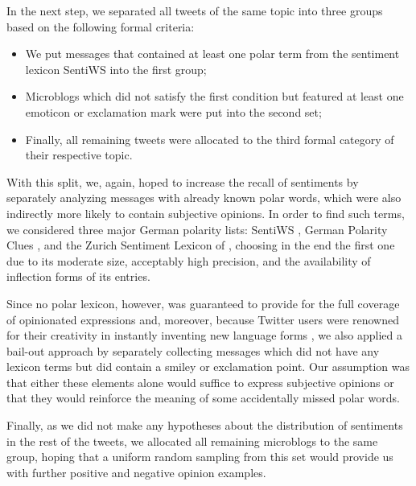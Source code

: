 In the next step, we separated all tweets of the same topic into three
groups based on the following formal criteria:
\begin{itemize}
\item We put messages that contained at least one polar term from the
  sentiment lexicon SentiWS \cite{Remus:10} into the first group;
\item Microblogs which did not satisfy the first condition but
  featured at least one emoticon or exclamation mark were put into the
  second set;
\item Finally, all remaining tweets were allocated to the third formal
  category of their respective topic.
\end{itemize}
With this split, we, again, hoped to increase the recall of sentiments
by separately analyzing messages with already known polar words, which
were also indirectly more likely to contain subjective opinions.  In
order to find such terms, we considered three major German polarity
lists: SentiWS \cite{Remus:10}, German Polarity Clues
\cite{Waltinger:10}, and the Zurich Sentiment Lexicon of
\citet{Clematide:10}, choosing in the end the first one due to its
moderate size, acceptably high precision, and the availability of
inflection forms of its entries.

Since no polar lexicon, however, was guaranteed to provide for the
full coverage of opinionated expressions and, moreover, because
Twitter users were renowned for their creativity in instantly
inventing new language forms \cite{Eisenstein:13}, we also applied a
bail-out approach by separately collecting messages which did not have
any lexicon terms but did contain a smiley or exclamation point.  Our
assumption was that either these elements alone would suffice to
express subjective opinions or that they would reinforce the meaning
of some accidentally missed polar words.

Finally, as we did not make any hypotheses about the distribution of
sentiments in the rest of the tweets, we allocated all remaining
microblogs to the same group, hoping that a uniform random sampling
from this set would provide us with further positive and negative
opinion examples.

